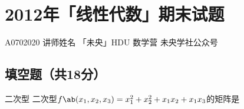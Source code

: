 \chapter{2012年「线性代数」\hdu 期末试题}
\date{2013年1月}{}{A0702020}
{讲师姓名}
{}{「未央」HDU 数学营}
{}{未央学社公众号}
\section{填空题（共18分）}
{
\begin{exercise}[3]{二次型}
    二次型$f\ab(x_1,x_2,x_3)=x_1^2+x_2^2+x_1x_2+x_1x_3$的矩阵是
\end{exercise}
\begin{solution}
    
\end{solution}
}